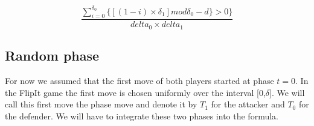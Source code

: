 \begin{equation}\label{first}
\dfrac{\sum_{i=0}^{\delta_{0}} \lbrace [( 1 - i ) \times \delta_{1}] mod \delta_{0} - d \rbrace  > 0 \rbrace }{delta_{0} \times delta_{1}} 
\end{equation}

\subsection{Random phase}
For now we assumed that the first move of both players started at phase $t=0$. In the FlipIt game the first move is chosen uniformly over the interval [0,$\delta$]. We will call this first move the phase move and denote it by $T_{1}$ for the attacker and $T_{0}$ for the defender.
We will have to integrate these two phases into the formula.  
%
%






